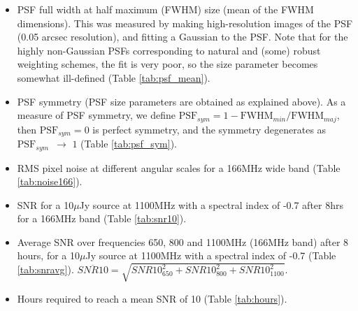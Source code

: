 \documentclass[sfheadings,a4paper,times,9pt,floats,floatfix]{article}
\begin{document}
\begin{itemize}
 \item PSF full width at half maximum (FWHM) size (mean of the FWHM dimensions). This was measured by making high-resolution
images of the PSF (0.05 arcsec
resolution), and fitting a Gaussian to the PSF. Note that for the highly non-Gaussian PSFs corresponding to natural and (some)
robust weighting schemes, the fit is very poor, so the size parameter becomes somewhat ill-defined (Table \ref{tab:psf_mean}).

 \item PSF symmetry (PSF size parameters are obtained as explained above). As a measure of PSF symmetry, we define 
$\text{PSF}_{sym}=1-\text{FWHM}_{min}/\text{FWHM}_{maj}$, then $\text{PSF}_{sym} = 0$ is perfect symmetry, and the symmetry
degenerates as $\text{PSF}_{sym}\,\,\, \rightarrow\,\,1$ (Table \ref{tab:psf_sym}).

 \item RMS pixel noise at different angular scales for a 166MHz wide band (Table \ref{tab:noise166}).
 
 \item SNR for a 10$\mu$Jy source at 1100MHz with a spectral index of -0.7 after 8hrs for a 166MHz band (Table \ref{tab:snr10}).
 \item Average SNR over frequencies 650, 800 and 1100MHz (166MHz band)
   after 8 hours, for a 10$\mu$Jy source at 1100MHz
with a spectral index of -0.7 (Table \ref{tab:snravg}). {$\overline{SNR10}=\sqrt{SNR10_{650}^2 + SNR10_{800}^2 +
SNR10_{1100}^2}$}.
 \item Hours required to reach a mean SNR of 10 (Table \ref{tab:hours}).
\end{itemize}
\end{document}
